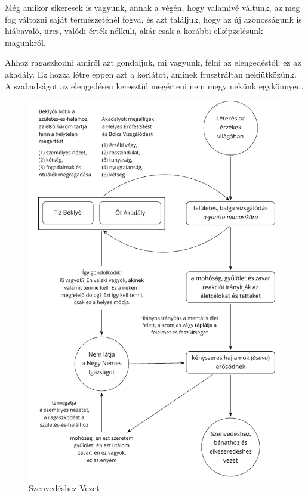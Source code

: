 Még amikor sikeresek is vagyunk, annak a végén, hogy valamivé váltunk,
az meg fog változni saját természeténél fogva, és azt találjuk, hogy az
új azonosságunk is hiábavaló, üres, valódi érték nélküli, akár csak a
korábbi elképzelésünk magunkról.

\enlargethispage*{\baselineskip}

Ahhoz ragaszkodni amiről azt gondoljuk, mi vagyunk, félni az
elengedéstől: ez az akadály. Ez hozza létre éppen azt a korlátot, aminek
frusztráltan nekiütközünk. A szabadságot az elengedésen keresztül
megérteni nem megy nekünk egykönnyen.

\cleartoverso
\figurepagelayout

\begin{figure}[h]
\vspace*{-10mm}%
\caption{Szenvedéshez Vezet}\label{fig-leading-to-suffering}

\centering

\includegraphics[width=\linewidth-5mm]{./manuscript/tex/diagrams/leading-to-suffering-hu.pdf}

\end{figure}

